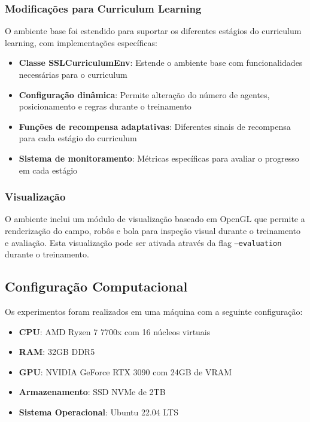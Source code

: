 \subsubsection{Modificações para Curriculum Learning}

O ambiente base foi estendido para suportar os diferentes estágios do curriculum learning, com implementações específicas:

\begin{itemize}
    \item \textbf{Classe SSLCurriculumEnv}: Estende o ambiente base com funcionalidades necessárias para o curriculum
    \item \textbf{Configuração dinâmica}: Permite alteração do número de agentes, posicionamento e regras durante o treinamento
    \item \textbf{Funções de recompensa adaptativas}: Diferentes sinais de recompensa para cada estágio do curriculum
    \item \textbf{Sistema de monitoramento}: Métricas específicas para avaliar o progresso em cada estágio
\end{itemize}

\subsubsection{Visualização}

O ambiente inclui um módulo de visualização baseado em OpenGL que permite a renderização do campo, robôs e bola para inspeção visual durante o treinamento e avaliação. Esta visualização pode ser ativada através da flag \texttt{--evaluation} durante o treinamento.

\subsection{Configuração Computacional}

Os experimentos foram realizados em uma máquina com a seguinte configuração:

\begin{itemize}
    \item \textbf{CPU}: AMD Ryzen 7 7700x com 16 núcleos virtuais
    \item \textbf{RAM}: 32GB DDR5
    \item \textbf{GPU}: NVIDIA GeForce RTX 3090 com 24GB de VRAM
    \item \textbf{Armazenamento}: SSD NVMe de 2TB
    \item \textbf{Sistema Operacional}: Ubuntu 22.04 LTS
\end{itemize}

